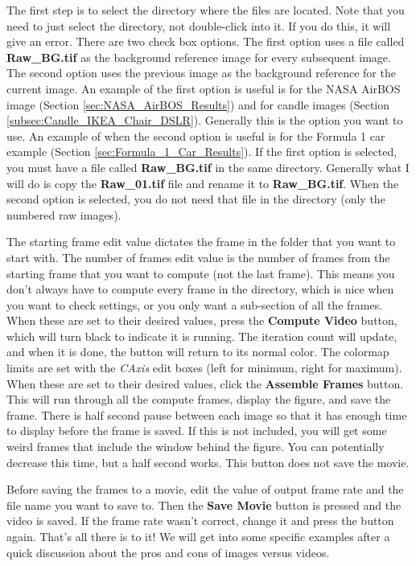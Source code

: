 \documentclass[letterpaper,12pt]{article}
\begin{document}
The first step is to select the directory where the files are located.  Note that you need to just select the directory, not double-click into it.  If you do this, it will give an error.  There are two check box options.  The first option uses a file called \textbf{Raw\_BG.tif} as the background reference image for every subsequent image.  The second option uses the previous image as the background reference for the current image.  An example of the first option is useful is for the NASA AirBOS image (Section \ref{sec:NASA_AirBOS_Results}) and for candle images (Section \ref{subsec:Candle_IKEA_Chair_DSLR}).  Generally this is the option you want to use.  An example of when the second option is useful is for the Formula 1 car example (Section \ref{sec:Formula_1_Car_Results}).  If the first option is selected, you must have a file called \textbf{Raw\_BG.tif} in the same directory.  Generally what I will do is copy the \textbf{Raw\_01.tif} file and rename it to \textbf{Raw\_BG.tif}.  When the second option is selected, you do not need that file in the directory (only the numbered raw images).

The starting frame edit value dictates the frame in the folder that you want to start with.  The number of frames edit value is the number of frames from the starting frame that you want to compute (not the last frame).  This means you don't always have to compute every frame in the directory, which is nice when you want to check settings, or you only want a sub-section of all the frames.  When these are set to their desired values, press the \textcolor{myBlue}{\textbf{Compute Video}} button, which will turn black to indicate it is running.  The iteration count will update, and when it is done, the button will return to its normal color.  The colormap limits are set with the \textcolor{myBlue}{\textit{CAxis}} edit boxes (left for minimum, right for maximum).  When these are set to their desired values, click the \textcolor{myBlue}{\textbf{Assemble Frames}} button.  This will run through all the compute frames, display the figure, and save the frame.  There is half second pause between each image so that it has enough time to display before the frame is saved.  If this is not included, you will get some weird frames that include the window behind the figure.  You can potentially decrease this time, but a half second works.  This button does not save the movie.

Before saving the frames to a movie, edit the value of output frame rate and the file name you want to save to.  Then the \textcolor{myBlue}{\textbf{Save Movie}} button is pressed and the video is saved.  If the frame rate wasn't correct, change it and press the button again.  That's all there is to it!  We will get into some specific examples after a quick discussion about the pros and cons of images versus videos.
\end{document}
